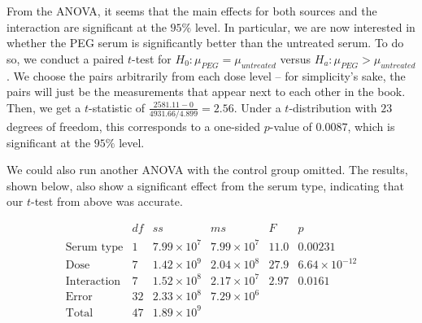 \documentclass{article}
\begin{document}
From the ANOVA, it seems that the main effects for both sources and the interaction are significant at the $95\%$ level. In particular, we are now interested in whether the PEG serum is significantly better than the untreated serum. To do so, we conduct a paired $t$-test for $H_0:\mu_{PEG}=\mu_{untreated}$ versus $H_a:\mu_{PEG}>\mu_{untreated}$. We choose the pairs arbitrarily from each dose level -- for simplicity's sake, the pairs will just be the measurements that appear next to each other in the book. Then, we get a $t$-statistic of $\frac{2581.11-0}{4931.66/4.899}=2.56$. Under a $t$-distribution with $23$ degrees of freedom, this corresponds to a one-sided $p$-value of $0.0087$, which is significant at the $95\%$ level. 

We could also run another ANOVA with the control group omitted. The results, shown below, also show a significant effect from the serum type, indicating that our $t$-test from above was accurate.

$$\begin{array}{c|ccccc}
&df&ss&ms&F&p\\
\hline
\text{Serum type}&1&7.99\times10^7&7.99\times10^7&11.0&0.00231\\
\text{Dose}&7&1.42\times10^9&2.04\times10^8&27.9&6.64\times10^{-12}\\
\text{Interaction}&7&1.52\times10^8&2.17\times10^7&2.97&0.0161\\
\text{Error}&32&2.33\times10^8&7.29\times10^6\\
\text{Total}&47&1.89\times10^9\\
\end{array}$$
\end{document}
